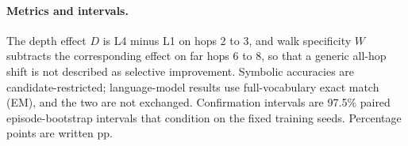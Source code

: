 \paragraph{Metrics and intervals.}
The depth effect $D$ is L4 minus L1 on hops 2 to 3, and walk specificity $W$ subtracts the corresponding effect on far hops 6 to 8, so that a generic all-hop shift is not described as selective improvement.  %
Symbolic accuracies are candidate-restricted; language-model results use full-vocabulary exact match (EM), and the two are not exchanged.  %
Confirmation intervals are 97.5\% paired episode-bootstrap intervals that condition on the fixed training seeds.  %
Percentage points are written pp.

